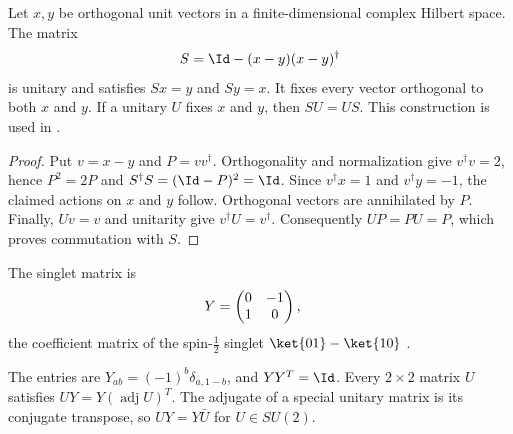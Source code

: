 \begin{lemma}%
    \label{lem:peps_unitary_vector_swap}
    \leanok
    Let $x,y$ be orthogonal unit vectors in a finite-dimensional complex
    Hilbert space. The matrix
    \begin{align}
        S=\Id-(x-y)(x-y)^\dagger \notag
    \end{align}
    is unitary and satisfies $Sx=y$ and $Sy=x$. It fixes every vector
    orthogonal to both $x$ and $y$. If a unitary $U$ fixes $x$ and $y$, then
    $SU=US$. This construction is used in
    \cite[Theorem~6.17]{Schuch2010PEPS}.
\end{lemma}

\begin{proof}\leanok
    Put $v=x-y$ and $P=vv^\dagger$. Orthogonality and normalization give
    $v^\dagger v=2$, hence $P^2=2P$ and $S^\dagger S=(\Id-P)^2=\Id$.
    Since $v^\dagger x=1$ and $v^\dagger y=-1$, the claimed actions on
    $x$ and $y$ follow. Orthogonal vectors are annihilated by $P$.
    Finally, $Uv=v$ and unitarity give $v^\dagger U=v^\dagger$.
    Consequently $UP=PU=P$, which proves commutation with $S$.
\end{proof}

\begin{definition}
    \label{def:characters_singlet_matrix}
    \leanok
    The singlet matrix is
    \begin{align}
        Y & =\begin{pmatrix}0&-1\\1&0\end{pmatrix}, \notag
    \end{align}
    the coefficient matrix of the spin-$\tfrac12$ singlet
    $\ket{01}-\ket{10}$ \cite[Appendix~A]{Cirac2021Matrix}.
\end{definition}

\begin{lemma}
    \label{thm:characters_singlet_matrix}
    \leanok
    The entries are $Y_{ab}=(-1)^b\delta_{a,1-b}$, and $YY^T=\Id$. Every
    $2\times2$ matrix $U$ satisfies $UY=Y(\operatorname{adj}U)^T$. The
    adjugate of a special unitary matrix is its conjugate transpose, so
    $UY=Y\bar U$ for $U\in SU(2)$.
\end{lemma}

